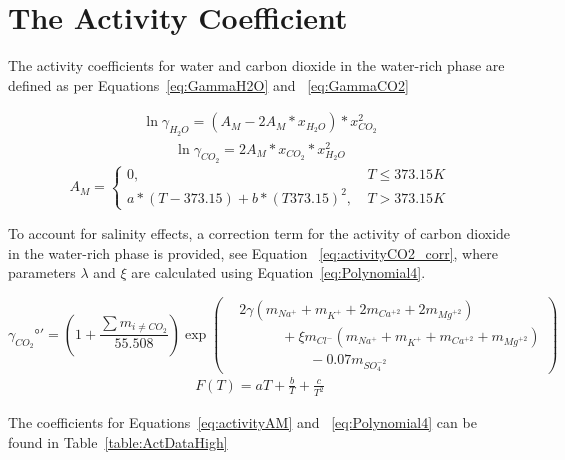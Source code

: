 \section{The Activity Coefficient}
\label{sec:activ_constant}

The activity coefficients for water and carbon dioxide in the water-rich phase are defined as per Equations~\eqref{eq:GammaH2O} and ~\eqref{eq:GammaCO2}	

\begin{align} 
    \ln \gamma_{H_2O} = \left( A_M -2A_M * x_{H_2O} \right) * x_{CO_2}^2 \label{eq:GammaH2O}
\end{align}
\begin{align} 
    \ln \gamma_{CO_2} = 2A_M * x_{CO_2} * x_{H_2O}^2  \label{eq:GammaCO2}
\end{align}
\begin{equation}
    \label{eq:activityAM}
    A_M = \left\{
    \begin{aligned}
    0 , & \ T \leq 373.15 K \\
    a * (T - 373.15) + b * (T373.15)^2 , & \ T > 373.15 K
    \end{aligned}
    \right.
\end{equation}

To account for salinity effects, a correction term for the activity of carbon dioxide in the water-rich phase is provided, see Equation ~\eqref{eq:activityCO2_corr}, where parameters \(\lambda\) and \(\xi\) are calculated using Equation~\eqref{eq:Polynomial4}.

\begin{equation}
    \label{eq:activityCO2_corr}
    \gamma_{CO_2}°{'} = \left(1 +\frac{\sum m_{i\neq CO_2}}{55.508} \right) \exp \left(
    \begin{aligned}
    &2\gamma (m_{Na^{+}} + m_{K^{+}} + 2m_{Ca^{+2}} + 2m_{Mg^{+2}}) \\
    &\qquad \quad+ \xi m_{Cl^{-}}(m_{Na^{+}} + m_{K^{+}} + m_{Ca^{+2}} + m_{Mg^{+2}}) \\
    &\qquad \qquad \quad - 0.07m_{SO_4^{-2}}
    \end{aligned}
    \right)
\end{equation}
\begin{align} 
    F(T) = aT +\frac{b}{T} + \frac{c}{T^2} \label{eq:Polynomial4}
\end{align}

The coefficients for Equations~\eqref{eq:activityAM} and ~\eqref{eq:Polynomial4} can be found in Table~\ref{table:ActDataHigh}


